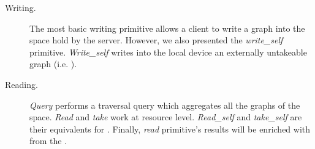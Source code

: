 \begin{description}
 \item[Writing.]
      The most basic writing primitive allows a client to write a graph into the space hold by the server.
      However, we also presented the \emph{write\_self} primitive.
      \emph{Write\_self} writes into the local device an externally untakeable graph (i.e. \selfgraphs{}).
 \item[Reading.]
      \emph{Query} performs a traversal query which aggregates all the graphs of the space.
      \emph{Read} and \emph{take} work at resource level.
      \emph{Read\_self} and \emph{take\_self} are their equivalents for \selfgraphs{}.
      Finally, \emph{read} primitive's results will be enriched with \selfgraphs{} from the \outerspace{}. %
\end{description}